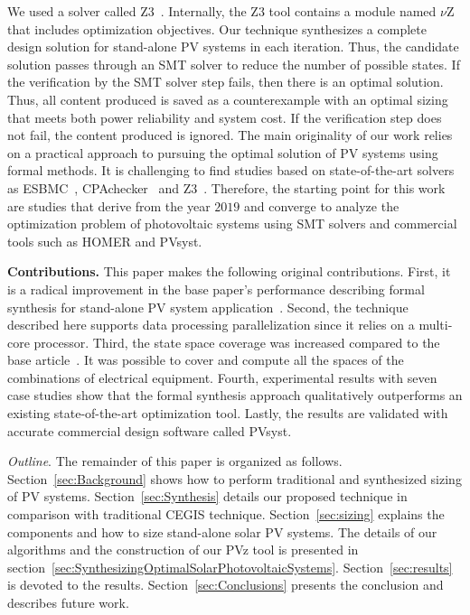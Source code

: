 \documentclass[review]{elsarticle}
\begin{document}
We used a solver called Z3~\citep{BjornerPF15}. Internally, the Z3 tool contains a module named $\nu$Z that includes optimization objectives. Our technique synthesizes a complete design solution for stand-alone PV systems in each iteration. Thus, the candidate solution passes through an SMT solver to reduce the number of possible states. If the verification by the SMT solver step fails, then there is an optimal solution. Thus, all content produced is saved as a counterexample with an optimal sizing that meets both power reliability and system cost. If the verification step does not fail, the content produced is ignored. The main originality of our work relies on a practical approach to pursuing the optimal solution of PV systems using formal methods. It is challenging to find studies based on state-of-the-art solvers as ESBMC~\citep{esbmc2018}, CPAchecker~\citep{Beyer2011} and Z3~\citep{BjornerPF15}. Therefore, the starting point for this work~\citep{VSTTE2020, TrindadeCordeiro19, AraujoBCF16} are studies that derive from the year $2019$ and converge to analyze the optimization problem of photovoltaic systems using SMT solvers and commercial tools such as HOMER and PVsyst. 

\noindent \textbf{Contributions.} This paper makes the following original contributions. First, it is a radical improvement in the base paper's performance describing formal synthesis for stand-alone PV system application~\citep{DBLP:journals/corr/abs-1909-13139}. Second, the technique described here supports data processing parallelization since it relies on a multi-core processor. Third, the state space coverage was increased compared to the base article~\citep{VSTTE2020}. It was possible to cover and compute all the spaces of the combinations of electrical equipment. Fourth, experimental results with seven case studies show that the formal synthesis approach qualitatively outperforms an existing state-of-the-art optimization tool. Lastly, the results are validated with accurate commercial design software called PVsyst.

\noindent \textit{Outline}. The remainder of this paper is organized as follows. Section~\ref{sec:Background} shows how to perform traditional and synthesized sizing of PV systems. Section~\ref{sec:Synthesis} details our proposed technique in comparison with traditional CEGIS technique. Section~\ref{sec:sizing} explains the components and how to size stand-alone solar PV systems. The details of our algorithms and the construction of our PVz tool is presented in section~\ref{sec:SynthesizingOptimalSolarPhotovoltaicSystems}. Section~\ref{sec:results} is devoted to the results. Section~\ref{sec:Conclusions} presents the conclusion and describes future work.
\end{document}
